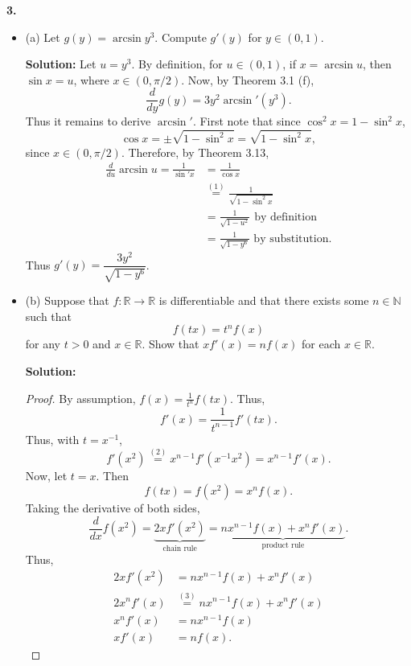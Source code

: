 \documentclass[11pt]{article}
\begin{document}
{\bf 3.} 
\begin{itemize}[label={},leftmargin=4mm, itemsep=1em, parsep=1em]
  \item (a) Let $g(y) = \arcsin y^{3}$. Compute $g'(y)$ for $y\in (0,1)$.

  {\bf Solution:} Let $u = y^{3}$. By definition, for $u \in (0,1)$, if $x =
  \arcsin u$, then $\sin x = u$, where $x \in (0, \pi / 2)$. Now, by Theorem 3.1 (f),
  \[ \frac{d}{dy}g(y) = 3y^{2}\arcsin'(y^{3}). \]
  Thus it remains to derive $\arcsin'$. First note that since $\cos^{2}x = 1 -
  \sin^{2}x$,
  \begin{equation}
    \cos x = \pm \sqrt{1 - \sin^{2}x} = \sqrt{1 - \sin^{2}x},
  \end{equation}
  since $x\in (0,\pi/2)$.
  Therefore, by Theorem 3.13,
  \begin{align*}
    \frac{d}{du}\arcsin u = \frac{1}{\sin'x} & = \frac{1}{\cos x} \\
    & \stackrel{(1)}{=} \frac{1}{\sqrt{1 - \sin^{2}x}} \\
    & = \frac{1}{\sqrt{1 - u^{2}}} \text{ by definition}\\
    & = \frac{1}{\sqrt{1 - y^{6}}} \text{ by substitution}.
  \end{align*}
  Thus $g'(y) = \dfrac{3y^{2}}{\sqrt{1-y^{6}}}$.

  \item (b) Suppose that $f:\mathbb{R} \rightarrow \mathbb{R}$ is differentiable
    and that there exists some $n\in \mathbb{N}$ such that 
    \[ f(tx) = t^{n}f(x) \]
    for any $t > 0$ and $x \in \mathbb{R}$. Show that $xf'(x) = nf(x)$ for each
    $x \in \mathbb{R}$.

  {\bf Solution:}
  \begin{proof}
    By assumption, $f(x) = \frac{1}{t^{n}}f(tx)$. Thus,
    \begin{equation}
      f'(x) = \frac{1}{t^{n-1}}f'(tx).
    \end{equation}
    Thus, with $t = x^{-1}$, 
    \begin{equation}
      f'(x^{2}) \stackrel{(2)}{=} x^{n-1}f'(x^{-1}x^{2}) = x^{n-1}f'(x).
    \end{equation}
    Now, let $t = x$. Then 
    \[ f(tx) = f(x^{2}) = x^{n}f(x). \]
    Taking the derivative of both sides, 
    \[ \frac{d}{dx}f(x^{2}) = \underbrace{2xf'(x^{2})}_{\text{chain rule}} =
    \underbrace{nx^{n-1}f(x) + x^{n}f'(x)}_{\text{product rule}}. \]
    Thus,
    \begin{align*}
      2xf'(x^{2}) & = nx^{n-1}f(x) + x^{n}f'(x) \\
      2x^{n}f'(x) & \stackrel{(3)}{=} nx^{n-1}f(x) + x^{n}f'(x) \\
      x^{n}f'(x) & = nx^{n-1}f(x) \\
      xf'(x) & = nf(x).
    \end{align*}
  \end{proof}
\end{itemize}
\end{document}
